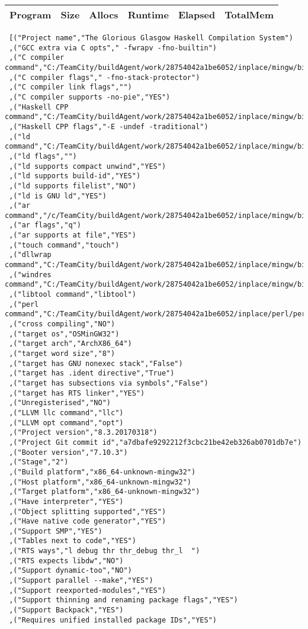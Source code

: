 \begin{tabular}{ c c c c c c }
Program & Size & Allocs & Runtime & Elapsed & TotalMem\\
\hline
\end{tabular}
\begin{verbatim}
 [("Project name","The Glorious Glasgow Haskell Compilation System")
 ,("GCC extra via C opts"," -fwrapv -fno-builtin")
 ,("C compiler command","C:/TeamCity/buildAgent/work/28754042a1be6052/inplace/mingw/bin/gcc.exe")
 ,("C compiler flags"," -fno-stack-protector")
 ,("C compiler link flags","")
 ,("C compiler supports -no-pie","YES")
 ,("Haskell CPP command","C:/TeamCity/buildAgent/work/28754042a1be6052/inplace/mingw/bin/gcc.exe")
 ,("Haskell CPP flags","-E -undef -traditional")
 ,("ld command","C:/TeamCity/buildAgent/work/28754042a1be6052/inplace/mingw/bin/ld.exe")
 ,("ld flags","")
 ,("ld supports compact unwind","YES")
 ,("ld supports build-id","YES")
 ,("ld supports filelist","NO")
 ,("ld is GNU ld","YES")
 ,("ar command","/c/TeamCity/buildAgent/work/28754042a1be6052/inplace/mingw/bin/ar")
 ,("ar flags","q")
 ,("ar supports at file","YES")
 ,("touch command","touch")
 ,("dllwrap command","C:/TeamCity/buildAgent/work/28754042a1be6052/inplace/mingw/bin/dllwrap.exe")
 ,("windres command","C:/TeamCity/buildAgent/work/28754042a1be6052/inplace/mingw/bin/windres.exe")
 ,("libtool command","libtool")
 ,("perl command","C:/TeamCity/buildAgent/work/28754042a1be6052/inplace/perl/perl")
 ,("cross compiling","NO")
 ,("target os","OSMinGW32")
 ,("target arch","ArchX86_64")
 ,("target word size","8")
 ,("target has GNU nonexec stack","False")
 ,("target has .ident directive","True")
 ,("target has subsections via symbols","False")
 ,("target has RTS linker","YES")
 ,("Unregisterised","NO")
 ,("LLVM llc command","llc")
 ,("LLVM opt command","opt")
 ,("Project version","8.3.20170318")
 ,("Project Git commit id","a7dbafe9292212f3cbc21be42eb326ab0701db7e")
 ,("Booter version","7.10.3")
 ,("Stage","2")
 ,("Build platform","x86_64-unknown-mingw32")
 ,("Host platform","x86_64-unknown-mingw32")
 ,("Target platform","x86_64-unknown-mingw32")
 ,("Have interpreter","YES")
 ,("Object splitting supported","YES")
 ,("Have native code generator","YES")
 ,("Support SMP","YES")
 ,("Tables next to code","YES")
 ,("RTS ways","l debug thr thr_debug thr_l  ")
 ,("RTS expects libdw","NO")
 ,("Support dynamic-too","NO")
 ,("Support parallel --make","YES")
 ,("Support reexported-modules","YES")
 ,("Support thinning and renaming package flags","YES")
 ,("Support Backpack","YES")
 ,("Requires unified installed package IDs","YES")

\end{verbatim}
